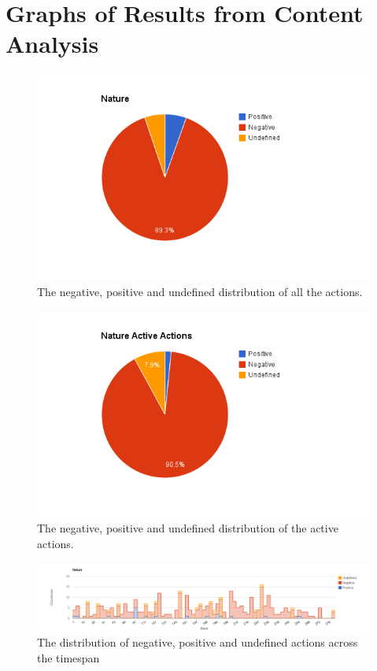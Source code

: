 \chapter{Graphs of Results from Content Analysis}
\label{appendix:graphs}
\begin{figure}[!h]
	\centering
	\includegraphics[width=\textwidth, keepaspectratio]{figures/nature-p.png}
	\caption{The negative, positive and undefined distribution of all the actions.}
	\label{figure:nature-p}
\end{figure}

\begin{figure}[!h]
	\centering
	\includegraphics[width=\textwidth, keepaspectratio]{figures/nature-pa.png}
	\caption{The negative, positive and undefined distribution of the active actions.}
	\label{figure:nature-pa}
\end{figure}

\begin{figure}
	\centering
	\includegraphics[width=\textwidth, keepaspectratio]{figures/nature-l.png}
	\caption{The distribution of negative, positive and undefined actions across the timespan}
	\label{figure:nature-la}
\end{figure}

